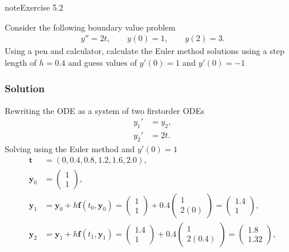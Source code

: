 \documentclass[letterpaper,10pt,english]{jupyterBook}
\begin{document}
\begin{sphinxadmonition}{note}{Exercise 5.2}

\sphinxAtStartPar
Consider the following boundary value problem
\begin{align*}
    y'' = 2t, \qquad y(0) = 1, \qquad y(2) = 3.
\end{align*}
\sphinxAtStartPar
Using a pen and calculator, calculate the Euler method solutions using a step length of \(h=0.4\) and guess values of \(y'(0) = 1\) and \(y'(0) = -1\)
\subsubsection*{Solution}

\sphinxAtStartPar
Rewriting the ODE as a system of two first\sphinxhyphen{}order ODEs
\begin{align*}
    y_1' &= y_2, \\
    y_2' &= 2t.
\end{align*}
\sphinxAtStartPar
Solving using the Euler method and \(y'(0)=1\)
\begin{align*}
    \mathbf{t} &= (0, 0.4, 0.8, 1.2, 1.6, 2.0), \\
    \mathbf{y}_0 &= \begin{pmatrix} 1 \\ 1 \end{pmatrix}, \\
    \mathbf{y}_1 &= \mathbf{y}_0 + h \mathbf{f}(t_0, \mathbf{y}_0) 
    = \begin{pmatrix} 1 \\ 1 \end{pmatrix} + 0.4 \begin{pmatrix} 1 \\ 2(0) \end{pmatrix} 
    = \begin{pmatrix} 1.4 \\ 1 \end{pmatrix}, \\
    \mathbf{y}_2 &= \mathbf{y}_1 + h \mathbf{f}(t_1, \mathbf{y}_1) 
    = \begin{pmatrix} 1.4 \\ 1 \end{pmatrix} + 0.4 \begin{pmatrix} 1 \\ 2(0.4) \end{pmatrix} 
    = \begin{pmatrix} 1.8 \\ 1.32 \end{pmatrix}, \\

\end{align*}
\end{sphinxadmonition}
\end{document}
